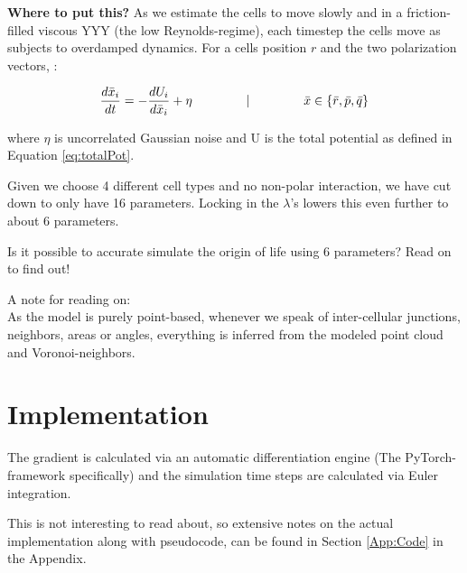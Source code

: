 \textbf{Where to put this?}
As we estimate the cells to move slowly and in a friction-filled viscous YYY (the low Reynolds-regime), each timestep the cells move as subjects to overdamped dynamics. For a cells position $r$ and the two polarization vectors, :

\begin{equation}
    \frac{d \bar{x}_i}{d t}=-\frac{d U_i}{d \bar{x}_i}+\eta \hspace{1.5cm}|\hspace{1.5cm}  \bar{x} \in \{\bar{r}, \bar{p}, \bar{q}\}
\end{equation}

where $\eta$ is uncorrelated Gaussian noise and U is the total potential as defined in Equation \ref{eq:totalPot}.

Given we choose 4 different cell types and no non-polar interaction, we have cut down to only have 16 parameters. Locking in the $\lambda$'s lowers this even further to about 6 parameters. 

Is it possible to accurate simulate the origin of life using 6 parameters? Read on to find out!

A note for reading on:\\
As the model is purely point-based, whenever we speak of inter-cellular junctions, neighbors, areas or angles, everything is inferred from the modeled point cloud and Voronoi-neighbors.

\section{Implementation}
The gradient is calculated via an automatic differentiation engine (The PyTorch-framework specifically) and the simulation time steps are calculated via Euler integration.

This is not interesting to read about, so extensive notes on the actual implementation along with pseudocode, can be found in Section \ref{App:Code} in the Appendix.

